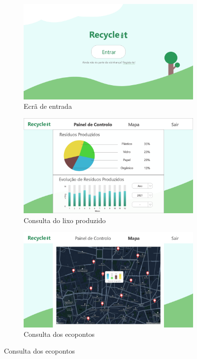 \documentclass[11pt, a4paper, oneside]{book}
\begin{document}
\begin{appendices}
\begin{figure}[h!]
    \begin{subfigure}[t]{0.99\textwidth}
        \centering
        \includegraphics[width=120mm]{img/mockups/web-1.png}
        \caption{Ecrã de entrada}
    \end{subfigure}
    \begin{subfigure}[t]{0.99\textwidth}
        \centering
        \includegraphics[width=120mm]{img/mockups/web-2.png}
        \caption{Consulta do lixo produzido}
    \end{subfigure}
    \begin{subfigure}[t]{0.99\textwidth}
        \centering
        \includegraphics[width=120mm]{img/mockups/web-3.png}
        \caption{Consulta dos ecopontos}
    \end{subfigure}
    

\end{figure}
\end{appendices}
\end{document}
